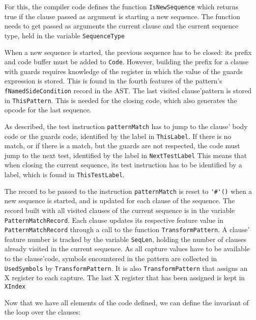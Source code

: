 \documentclass[a4paper]{memoir}
\begin{document}
For this, the compiler code defines the function
\lstinline!IsNewSequence! which returns true if the clause passed as argument
is starting a new sequence. The function needs to get passed as arguments the current clause and
the current sequence type, held in the variable \lstinline!SequenceType!

When a new sequence is started, the previous sequence has to be closed: its
prefix and code buffer must be added to \lstinline!Code!. However, building the
prefix for a clause with guards requires knowledge of the register in which the
value of the guards expression is stored. This is found in the fourth features
of the pattern's \lstinline!fNamedSideCondition! record in the AST.
The last visited clause'pattern is stored in \lstinline!ThisPattern!. This is
needed for the closing code, which also generates the opcode for the last sequence.

As described, the test instruction \lstinline!patternMatch! has to jump to the
clause' body code or the guards code, identified by the label in
\lstinline!ThisLabel!. If there is no match, or if there is a match, but the
guards are not respected, the code must jump to the next test, identified by the
label in \lstinline!NextTestLabel!
This means that when closing the current sequence, its test instruction has to
be identified by a label, which is found in \lstinline!ThisTestLabel!.

The record to be passed to the instruction \lstinline!patternMatch! is reset to
\lstinline!'#'()! when a new sequence is started, and is updated for each clause
of the sequence. The record built with all visited clauses of the current
sequence is in the variable \lstinline!PatternMatchRecord!.
Each clause updates its respective feature value in
\lstinline!PatternMatchRecord! through a call to the function \lstinline!TransformPattern!.
A clause' feature number is tracked by the
variable \lstinline!SeqLen!, holding the number of clauses already visited in
the current sequence.
As all capture values have to be available to the clause'code, symbols encountered
in the pattern are collected in \lstinline!UsedSymbols! by
\lstinline!TransformPattern!. It is also \lstinline!TransformPattern! that
assigns an X register to each capture. The last X register that has been
assigned is kept in \lstinline!XIndex!

Now that we have all elements of the code defined, we can define the invariant
of the loop over the clauses:
\end{document}

